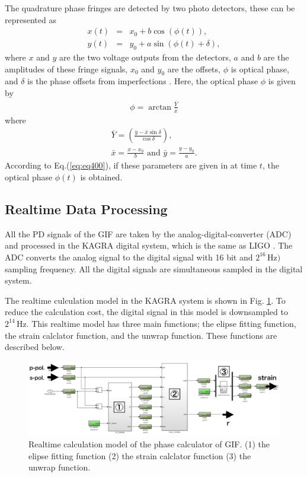 The quadrature phase fringes are detected by two photo detectors, these can be represented as 
\begin{eqnarray}
  x(t) &=& x_0 + b \cos(\phi(t)), \label{eq:eq450b} \\
  y(t) &=& y_0 + a \sin(\phi(t)+\delta), \label{eq:eq450a}  
\end{eqnarray}
where $x$ and $y$ are the two voltage outputs from the detectors, $a$ and $b$ are the amplitudes of these fringe signals, $x_0$ and $y_0$ are the offsets, $\phi$ is optical phase, and $\delta$ is the phase offsets from imperfections \cite{zumberge2004resolving}. Here, the optical phase $\phi$ is given by
\begin{eqnarray}
  \phi = \arctan {\frac{\bar{Y}}{\bar{x}}} \label{eq:eq440c}
\end{eqnarray}
where 
\begin{eqnarray}\label{eq:eq440a} 
  \bar{Y} = \left(\frac{\bar{y}-\bar{x}\sin{\delta}}{\cos{\delta}}\right), \\
  \bar{x} = \frac{x-x_0}{b}\,\,\mathrm{and}\,\,\bar{y} = \frac{y-y_0}{a}. \label{eq:eq440b}
\end{eqnarray}
According to Eq.(\ref{eq:eq400}), if these parameters are given in at time $t$, the optical phase $\phi(t)$ is obtained.


\subsection{Realtime Data Processing} \label{sec:142}
All the PD signals of the GIF are taken by the analog-digital-converter (ADC) and processed in the KAGRA digital system, which is the same as LIGO \cite{bork2001overview}. The ADC converts the analog signal to the digital signal with 16 bit and $2^{16}\,\mathrm{Hz})$ sampling frequency. All the digital signals are simultaneous sampled in the digital system. 

The realtime culculation model in the KAGRA system is shown in Fig. \ref{img:img420}. To reduce the calculation cost, the digital signal in this model is downsampled to $2^{14}\,\mathrm{Hz}$. This realtime model has three main functions; the elipse fitting function, the strain calclator function, and the unwrap function. These functions are described below.
\begin{figure}[h]
  \centering
  \includegraphics[width=15.0cm]{./img_chap4/img420.png}
  \caption{Realtime calculation model of the phase calculator of GIF. (1) the elipse fitting function (2) the strain calclator function (3) the unwrap function.}\label{img:img420}
\end{figure}

